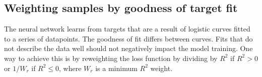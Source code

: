 \subsection{Weighting samples by goodness of target fit}
The neural network learns from targets that are a result of logistic curves fitted to a series of datapoints.
The goodness of fit differs between curves.
Fits that do not describe the data well should not negatively impact the model training.
One way to achieve this is by reweighting the loss function by dividing by $R^2$ if $R^2 >0$ or $1 / W_r$ if $R^2\leq 0$, where $W_r$ is a minimum $R^2$ weight.
